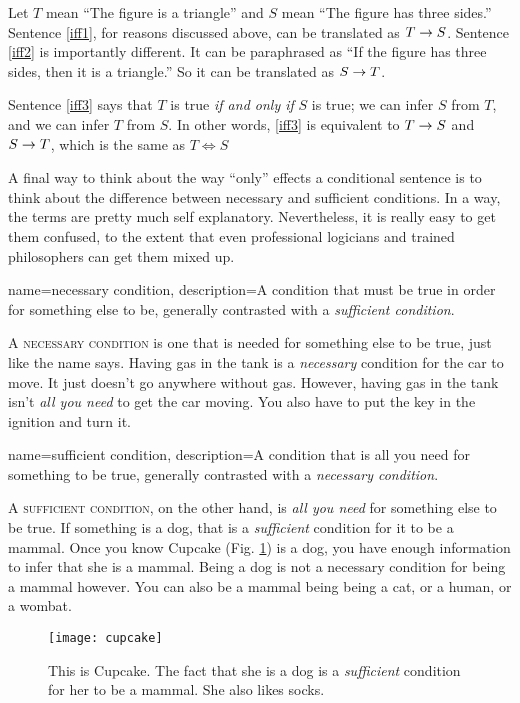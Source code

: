 Let $T$ mean ``The figure is a triangle'' and $S$ mean ``The figure has three sides.'' Sentence \ref{iff1}, for reasons discussed above, can be translated as $T\mathrel{\rightarrow} S$. Sentence \ref{iff2} is importantly different. It can be paraphrased as ``If the figure has three sides, then it is a triangle.'' So it can be translated as $S\mathrel{\rightarrow} T$.

Sentence \ref{iff3} says that $T$ is true \emph{if and only if} $S$ is true; we can infer $S$ from $T$, and we can infer $T$ from $S$.  In other words, \ref{iff3} is equivalent to $T\mathrel{\rightarrow} S$ and $S\mathrel{\rightarrow} T$, which is the same as $T \iff S$

A final way to think about the way ``only'' effects a conditional sentence is to think about the  difference between necessary and sufficient conditions. In a way, the terms are pretty much self explanatory. Nevertheless, it is really easy to get them confused, to the extent that even professional logicians and trained philosophers can get them mixed up.


{
name=necessary condition,
description={A condition that must be true in order for something else to be, generally contrasted with a \textit{sufficient condition}.}
}

A \textsc{\gls{necessary condition}}\label{def:necessary_condition} is one that is needed for something else to be true, just like the name says. Having gas in the tank is a \textit{necessary} condition for the car to move. It just doesn't go anywhere without gas. However, having gas in the tank isn't \textit{all you need} to get the car moving. You also have to put the key in the  ignition and turn it.

{
name=sufficient condition,
description={A condition that is all you need for something to be true, generally contrasted with a \textit{necessary condition}.}
}

A \textsc{\gls{sufficient condition}}\label{def:sufficient_condition}, on the other hand, is \textit{all you need} for something else to be true. If something is a dog, that is a \textit{sufficient} condition for it to be a mammal. Once you know Cupcake (Fig. \ref{fig:cupcake}) is a dog, you have enough information to infer that she is a mammal. Being a dog is not a necessary condition for being a mammal however. You can also be a mammal being being a cat, or a human, or a wombat.

\begin{figure}
\begin{center}
\texttt{[image: cupcake]}
\end{center}
\caption{This is Cupcake. The fact that she is a dog is a \textit{sufficient} condition for her to be a mammal. She also likes socks.}
\label{fig:cupcake}
\end{figure}

